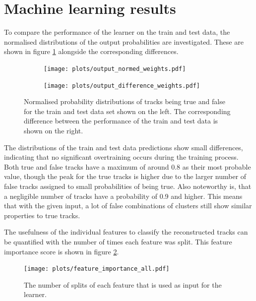 \section{Machine learning results}
To compare the performance of the learner on the train and test data, the normalised distributions of the output probabilities are investigated.
These are shown in figure \ref{fig:output} alongside the corresponding differences.

\begin{figure}
  \hspace{-1cm}
  \begin{subfigure}{0.53\textwidth}
      \centering
      \texttt{[image: plots/output\_normed\_weights.pdf]}
  \end{subfigure}
  \begin{subfigure}{0.53\textwidth}
      \texttt{[image: plots/output\_difference\_weights.pdf]}
  \end{subfigure}
  \caption{Normalised probability distributions of tracks being true and false for the train and test data set shown on the left.
  The corresponding difference between the performance of the train and test data is shown on the right.}
  \label{fig:output}
\end{figure}

The distributions of the train and test data predictions show small differences, indicating that no significant overtraining occurs during the training process.
Both true and false tracks have a maximum of around 0.8 as their most probable value, though the peak for the true tracks is higher due to the larger number
of false tracks assigned to small probabilities of being true. Also noteworthy is, that a negligible number of tracks have a probability of 0.9 and higher. This means that
with the given input, a lot of false combinations of clusters still show similar properties to true tracks.

The usefulness of the individual features to classify the reconstructed tracks can be quantified with the number of times each feature was split.
This feature importance score is shown in figure \ref{fig:importance}.

\begin{figure}
  \centering
  \texttt{[image: plots/feature\_importance\_all.pdf]}
  \caption{The number of splits of each feature that is used as input for the learner.}
  \label{fig:importance}
\end{figure}

